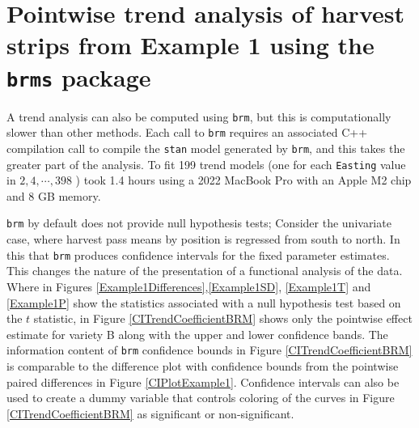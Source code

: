 \documentclass[phdcss]{SDSUThesis}
\begin{document}

\clearpage

\section{Pointwise trend analysis of harvest strips from Example 1 using the \texttt{brms} package}

A trend analysis can also be computed using \texttt{brm}, but this is computationally slower than other methods. Each call to \texttt{brm} requires an associated C++ compilation call to compile the \texttt{stan} model generated by \texttt{brm}, and this takes the greater part of the analysis. To fit 199 trend models (one for each \texttt{Easting} value in $2, 4,\cdots, 398$ ) took 1.4 hours using a 2022 MacBook Pro with an Apple M2 chip and 8 GB memory.

\texttt{brm} by default does not provide null hypothesis tests; Consider the univariate case, where harvest pass means by position is regressed from south to north. In this that \texttt{brm} produces confidence intervals for the fixed parameter estimates. This changes the nature of the presentation of a functional analysis of the data. Where in Figures \ref{Example1Differences},\ref{Example1SD}, \ref{Example1T} and \ref{Example1P} show the statistics associated with a null hypothesis test based on the $t$ statistic, in Figure \ref{CITrendCoefficientBRM} shows only the pointwise effect estimate for variety B along with the upper and lower confidence bands. The information content of \texttt{brm} confidence bounds in Figure \ref{CITrendCoefficientBRM} is comparable to the difference plot with confidence bounds from the pointwise paired differences in Figure \ref{CIPlotExample1}. Confidence intervals can also be used to create a dummy variable that controls coloring of the curves in Figure \ref{CITrendCoefficientBRM} as significant or non-significant.
\end{document}
